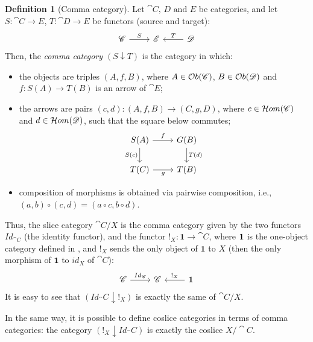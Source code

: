 \documentclass[a4paper, twoside,openright]{report}
\theoremstyle{plain}
\theoremstyle{definition}
\newtheorem{definition}[theorem]{Definition}
\begin{document}
\begin{definition}[Comma category]\label{def:comma_category}
    Let $\cat{C \text{, } D \text{ and } E}$ be categories, and let $S: \cat{C \rightarrow E}$, $T:\cat{D \rightarrow E}$ be functors (source and target):
    \[
        \begin{tikzcd}
            \cat{C} \arrow[r, "S"] & \cat{E} & \cat{D} \arrow[l, "T" swap]
        \end{tikzcd}
    \]
    Then, the \emph{comma category $(S \downarrow T)$} is the category in which: 
    \begin{itemize}
        \item the objects are triples $(A, f, B)$, where $A \in \mathcal{O}b(\mathscr{C})$, $B \in \mathcal{O}b(\mathscr{D})$ and $f: S(A) \rightarrow T(B)$ is an arrow of $\cat E$;
        \item the arrows are pairs $(c, d): (A, f, B) \rightarrow (C, g, D)$, where $c \in \mathcal{H}om(\mathscr{C})$ and $d \in \mathcal{H}om(\mathscr{D})$, such that the square below commutes;
        \[
            \begin{tikzcd}
            S(A) \arrow[r, "f"] \arrow[d, "S(c)" swap] & G(B) \arrow[d, "T(d)"] \\
            T(C) \arrow[r, "g" swap] & T(B)
            \end{tikzcd}
        \]
        \item composition of morphisms is obtained via pairwise composition, i.e., $(a, b) \circ (c, d) = (a \circ c, b \circ d)$.
    \end{itemize}
\end{definition}

Thus, the slice category $\cat C / X$ is the comma category given by the two functors $Id_{\cat C}$ (the identity functor), and the functor $!_X: \textbf{1} \rightarrow \cat C$, where $\textbf 1$ is the one-object category defined in , and $!_X$ sends the only object of $\textbf{1}$ to $X$ (then the only morphism of $\textbf{1}$ to $id_X$ of $\cat C$):
\[
    \begin{tikzcd}
        \cat C \arrow[r, "{Id_\cat C}"] & \cat C & \textbf{1} \arrow[l, "{!_X}"swap]
    \end{tikzcd}
\]
It is easy to see that $(Id_\cat C \downarrow !_X)$ is exactly the same of $\cat C / X$.

In the same way, it is possible to define coslice categories in terms of comma categories: the category $(!_X \downarrow Id_\cat C)$ is exactly the coslice $X / \cat C $.
\end{document}
